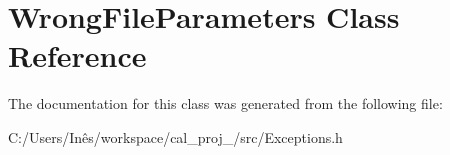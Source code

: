 \hypertarget{class_wrong_file_parameters}{}\section{Wrong\+File\+Parameters Class Reference}
\label{class_wrong_file_parameters}


The documentation for this class was generated from the following file\+:\begin{DoxyCompactItemize}
\item 
C\+:/\+Users/\+Inês/workspace/cal\+\_\+proj\+\_/src/Exceptions.\+h\end{DoxyCompactItemize}
